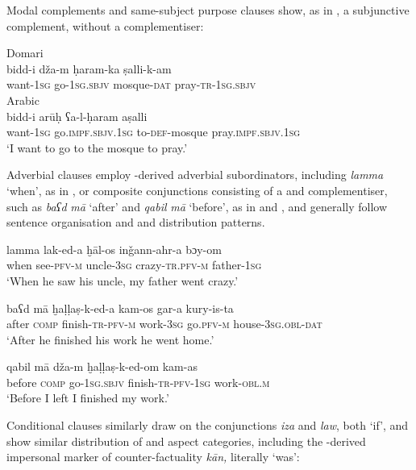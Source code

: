\documentclass[output=paper]{langsci/langscibook}
\begin{document}
Modal complements and same-subject purpose clauses show, as in , a subjunctive complement, without a complementiser:

\ea
\ea
{Domari}\\
\gll bidd-i  dža-m  ḥaram-ka ṣalli-k-am  \\
       want-\textsc{1sg} go-\textsc{1sg.sbjv} mosque-\textsc{dat} pray-\textsc{tr-1sg.sbjv}\\
\ex
{Arabic}\\
\gll bidd-i  arūḥ ʕa-l-ḥaram aṣalli  \\
       want-\textsc{1sg} go.\textsc{impf.sbjv.1sg} to-\textsc{def-}mosque pray.\textsc{impf.sbjv.1sg} \\
\glt    ‘I want to go to the mosque to pray.’
\z
\z

Adverbial clauses employ -derived adverbial subordinators, including \textit{lamma} ‘when’, as in , or composite conjunctions consisting of a  and complementiser, such as \textit{baʕd} \textit{mā} ‘after’ and \textit{qabil} \textit{mā} ‘before’, as in  and , and generally follow  sentence organisation and  and  distribution patterns.

\ea\label{lamma} \gll lamma lak-ed-a ḫāl-os inǧann-ahr-a bɔy-om\\
       when see-\textsc{pfv-m} uncle-\textsc{3sg} crazy-\textsc{tr.pfv-m} father-\textsc{1sg}\\
\glt     ‘When he saw his uncle, my father went crazy.’
\z

\ea\label{after} \gll baʕd mā ḫaḷḷaṣ-k-ed-a kam-os gar-a kury-is-ta\\
     after \textsc{comp} finish-\textsc{tr-pfv-m} work-\textsc{3sg} go.\textsc{pfv-m} house-\textsc{3sg.obl-dat}\\
\glt     ‘After he finished his work he went home.’
\z

\ea\label{before} \gll qabil mā dža-m ḫaḷḷaṣ-k-ed-om kam-as\\
       before  \textsc{comp} go-\textsc{1sg.sbjv} finish-\textsc{tr-pfv-1sg} work-\textsc{obl.m}\\
\glt     ‘Before I left I finished my work.’
\z

Conditional clauses similarly draw on the  conjunctions \textit{iza} and \textit{law}, both ‘if’, and show similar distribution of  and aspect categories, including the -derived impersonal marker of counter-factuality \textit{kān,} literally ‘was’:
\end{document}

